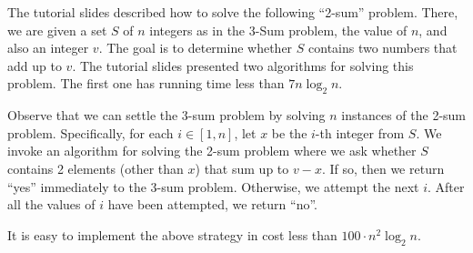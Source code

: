 \begin{sol} 
 The tutorial slides described how to solve the following ``2-sum'' problem. There, we are given a set $S$ of $n$ integers as in the 3-Sum problem, the value of $n$, and also an integer $v$. The goal is to determine whether $S$ contains two numbers that add up to $v$. The tutorial slides presented two algorithms for solving this problem. The first one has running time less than $7 n \log_2 n$. 

\vgap 

Observe that we can settle the 3-sum problem by solving $n$ instances of the 2-sum problem. Specifically, for each $i \in [1, n]$, let $x$ be the $i$-th integer from $S$. We invoke an algorithm for solving the 2-sum problem where we ask whether $S$ contains 2 elements (other than $x$) that sum up to $v - x$. If so, then we return ``yes'' immediately to the 3-sum problem. Otherwise, we attempt the next $i$. After all the values of $i$ have been attempted, we return ``no''. 

\vgap 

It is easy to implement the above strategy in cost less than $100 \cdot n^2 \log_2 n$. 
\end{sol}


% 



%
%


